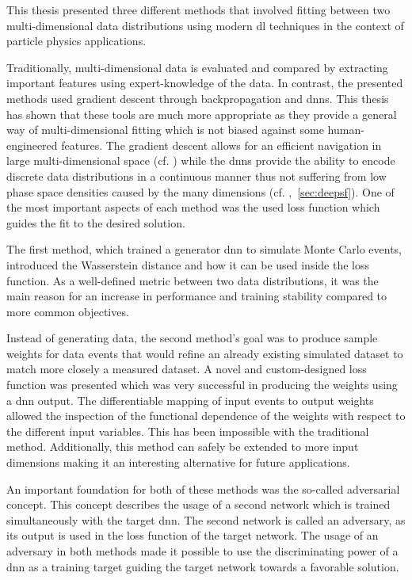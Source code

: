 

\glsresetall{}

This thesis presented three different methods that involved fitting between two multi-dimensional data distributions using modern \gls{dl} techniques in the context of particle physics applications.

Traditionally, multi-dimensional data is evaluated and compared by extracting important features using expert-knowledge of the data. In contrast, the presented methods used gradient descent through backpropagation and \glspl{dnn}. This thesis has shown that these tools are much more appropriate as they provide a general way of multi-dimensional fitting which is not biased against some human-engineered features. The gradient descent allows for an efficient navigation in large multi-dimensional space (cf. ) while the \glspl{dnn} provide the ability to encode discrete data distributions in a continuous manner thus not suffering from low phase space densities caused by the many dimensions (cf. ,~\ref{sec:deepsf}). One of the most important aspects of each method was the used loss function which guides the fit to the desired solution.

The first method, which trained a generator \gls{dnn} to simulate Monte Carlo events, introduced the Wasserstein distance and how it can be used inside the loss function. As a well-defined metric between two data distributions, it was the main reason for an increase in performance and training stability compared to more common objectives.

Instead of generating data, the second method's goal was to produce sample weights for data events that would refine an already existing simulated dataset to match more closely a measured dataset. A novel and custom-designed loss function was presented which was very successful in producing the weights using a \gls{dnn} output. The differentiable mapping of input events to output weights allowed the inspection of the functional dependence of the weights with respect to the different input variables. This has been impossible with the traditional method. Additionally, this method can safely be extended to more input dimensions making it an interesting alternative for future applications.

An important foundation for both of these methods was the so-called adversarial concept. This concept describes the usage of a second network which is trained simultaneously with the target \gls{dnn}. The second network is called an adversary, as its output is used in the loss function of the target network. The usage of an adversary in both methods made it possible to use the discriminating power of a \gls{dnn} as a training target guiding the target network towards a favorable solution.

